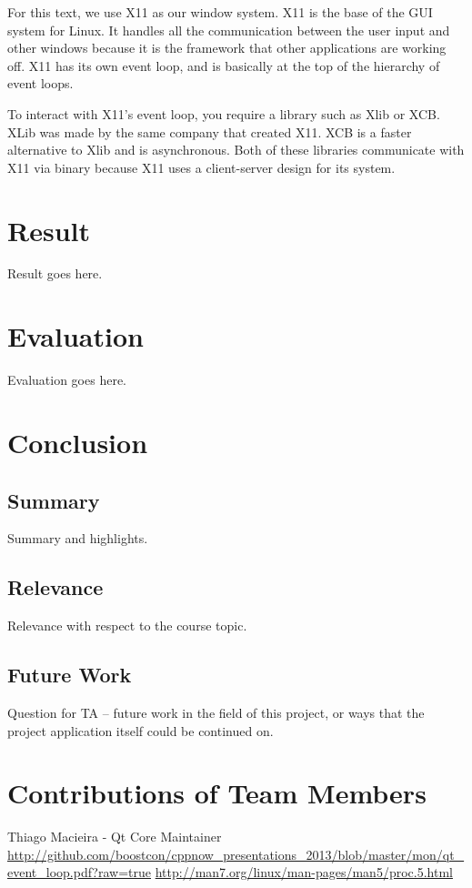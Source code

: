 \documentclass[12pt]{article}
\begin{document}
For this text, we use X11 as our window system.
X11 is the base of the GUI system for Linux.
It handles all the communication between the user input and other windows because it is the framework that other applications are working off.
X11 has its own event loop, and is basically at the top of the hierarchy of event loops.

To interact with X11's event loop, you require a library such as Xlib or XCB.
XLib was made by the same company that created X11.
XCB is a faster alternative to Xlib and is asynchronous.
Both of these libraries communicate with X11 via binary because X11 uses a client-server design for its system.


	
	\section{Result}
	Result goes here.
	
	\section{Evaluation}
	Evaluation goes here.
	
	\section{Conclusion}
	
	\subsection{Summary}
	Summary and highlights.
	
	\subsection{Relevance}
	Relevance with respect to the course topic.
	
	\subsection{Future Work}
	Question for TA -- future work in the field of this project, or ways that the project application itself could be continued on.
	
	
	\setcounter{secnumdepth}{0}
	\section{Contributions of Team Members}
	
	\begin{thebibliography}{3}
	 Thiago Macieira - Qt Core Maintainer \url{http://github.com/boostcon/cppnow_presentations_2013/blob/master/mon/qt_event_loop.pdf?raw=true}
	\url{http://man7.org/linux/man-pages/man5/proc.5.html}
	\end{thebibliography}{}
\end{document}
